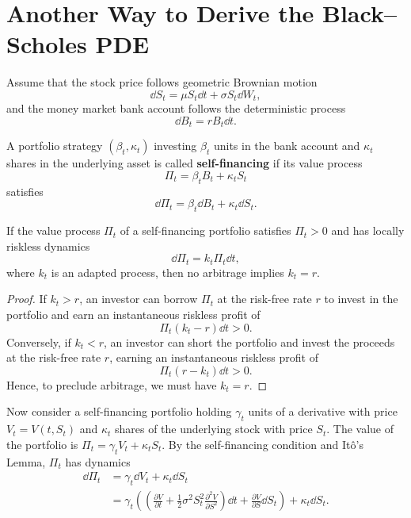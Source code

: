 \chapter{Another Way to Derive the Black--Scholes PDE}\label{ch:bs-pde-alternative}
Assume that the stock price follows geometric Brownian motion
\[
\dd S_t = \mu S_t\dd t + \sigma S_t\dd W_t,
\]
and the money market bank account follows the deterministic process
\[
\dd B_t = r B_t\dd t.
\]

\begin{definition}\label{def:self-financing-app}
    A portfolio strategy $(\beta_t, \kappa_t)$ investing $\beta_t$ units in the bank account and $\kappa_t$ shares in the underlying asset is called \textbf{self-financing} if its value process
    \[
    \Pi_t = \beta_t B_t + \kappa_t S_t
    \]
    satisfies
    \[
    \dd \Pi_t = \beta_t\dd B_t + \kappa_t\dd S_t.
    \]
\end{definition}

\begin{lemma}\label{lem:riskless-portfolio}
    If the value process $\Pi_t$ of a self-financing portfolio satisfies $\Pi_t > 0$ and has locally riskless dynamics
    \[
    \dd \Pi_t = k_t \Pi_t\dd t,
    \]
    where $k_t$ is an adapted process, then no arbitrage implies $k_t = r$.
\end{lemma}
\begin{proof}
    If $k_t > r$, an investor can borrow $\Pi_t$ at the risk-free rate $r$ to invest in the portfolio and earn an instantaneous riskless profit of
    \[
    \Pi_t(k_t - r)\dd t > 0.
    \]
    Conversely, if $k_t < r$, an investor can short the portfolio and invest the proceeds at the risk-free rate $r$, earning an instantaneous riskless profit of
    \[
    \Pi_t(r - k_t)\dd t > 0.
    \]
    Hence, to preclude arbitrage, we must have $k_t = r$.
\end{proof}

Now consider a self-financing portfolio holding $\gamma_t$ units of a derivative with price $V_t = V(t, S_t)$ and $\kappa_t$ shares of the underlying stock with price $S_t$. The value of the portfolio is $\Pi_t = \gamma_t V_t + \kappa_t S_t$. By the self-financing condition and It\^o's Lemma, $\Pi_t$ has dynamics
\begin{align*}
\dd \Pi_t &= \gamma_t\dd V_t + \kappa_t\dd S_t \\
&= \gamma_t \left(\left(\frac{\partial V}{\partial t} + \frac{1}{2}\sigma^2 S_t^2 \frac{\partial^2 V}{\partial S^2}\right)\dd t + \frac{\partial V}{\partial S}\dd S_t\right) + \kappa_t\dd S_t.
\end{align*}

